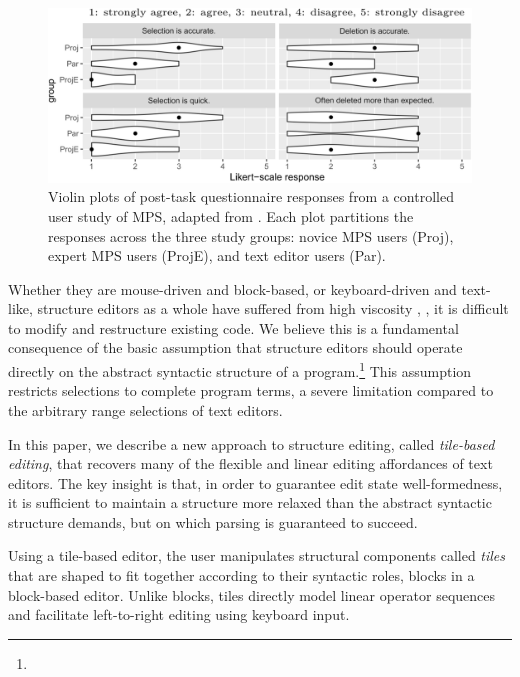 \begin{figure}[b]
  \centering
  \includegraphics[width=\columnwidth]{img/mps-violin-plots.png}
  \caption{Violin plots of post-task questionnaire responses
  from a controlled user study of MPS, adapted from \cite{ProjEfficiency}.
  Each plot partitions the responses across the three study groups:
  novice MPS users (Proj), expert MPS users (ProjE),
  and text editor users (Par).
  }
  \label{fig:mps-violin-plots}
\end{figure}

Whether they are mouse-driven and block-based,
or keyboard-driven and text-like,
structure editors as a whole have suffered
from high viscosity \cite{cog-dim},
\ie, it is difficult to modify
and restructure existing code.
We believe this is a fundamental consequence
of the basic assumption that structure editors
should operate directly on the abstract syntactic structure
of a program.\footnote{}
This assumption restricts selections to complete
program terms, a severe limitation compared to
the arbitrary range selections of text editors.

In this paper, we describe a new approach to structure
editing, called \emph{tile-based editing}, that
recovers many of the flexible and linear editing
affordances of text editors.
The key insight is that, in order to guarantee edit state
well-formedness, it is sufficient to maintain a structure
more relaxed than the abstract syntactic structure demands,
but on which parsing is guaranteed to succeed.

Using a tile-based editor, the user manipulates
structural components called \emph{tiles} that
are shaped to fit together according to their
syntactic roles, \ala blocks in a block-based editor.
Unlike blocks, tiles directly model linear
operator sequences and facilitate left-to-right
editing using keyboard input.

